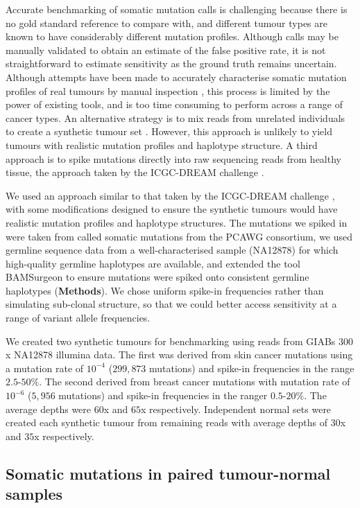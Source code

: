 \documentclass[notitlepage, twocolumn]{article}
\begin{document}
Accurate benchmarking of somatic mutation calls is challenging because there is no gold standard reference to compare with, and different tumour types are known to have considerably different mutation profiles. Although calls may be manually validated to obtain an estimate of the false positive rate, it is not straightforward to estimate sensitivity as the ground truth remains uncertain. Although attempts have been made to accurately characterise somatic mutation profiles of real tumours by manual inspection \cite{RN155}, this process is limited by the power of existing tools, and is too time consuming to perform across a range of cancer types. An alternative strategy is to mix reads from unrelated individuals to create a synthetic tumour set \cite{RN142}. However, this approach is unlikely to yield tumours with realistic mutation profiles and haplotype structure. A third approach is to spike mutations directly into raw sequencing reads from healthy tissue, the approach taken by the ICGC-DREAM challenge \cite{RN147}.

We used an approach similar to that taken by the ICGC-DREAM challenge \cite{RN147}, with some modifications designed to ensure the synthetic tumours would have realistic mutation profiles and haplotype structures. The mutations we spiked in were taken from called somatic mutations from the PCAWG consortium, we used germline sequence data from a well-characterised sample (NA12878) for which high-quality germline haplotypes are available, and extended the tool BAMSurgeon to ensure mutations were spiked onto consistent germline haplotypes (\textbf{Methods}). We chose uniform spike-in frequencies rather than simulating sub-clonal structure, so that we could better access sensitivity at a range of variant allele frequencies.

We created two synthetic tumours for benchmarking using reads from GIABs $300$x NA12878 illumina data. The first was derived from skin cancer mutations using a mutation rate of $10^{-4}$ ($299,873$ mutations) and spike-in frequencies in the range $2.5$-$50\%$. The second derived from breast cancer mutations with mutation rate of $10^{-6}$ ($5,956$ mutations) and spike-in frequencies in the ranger $0.5$-$20\%$. The average depths were $60$x and $65$x respectively. Independent normal sets were created each synthetic tumour from remaining reads with average depths of $30$x and $35$x respectively.

\subsection*{Somatic mutations in paired tumour-normal samples}
\end{document}
